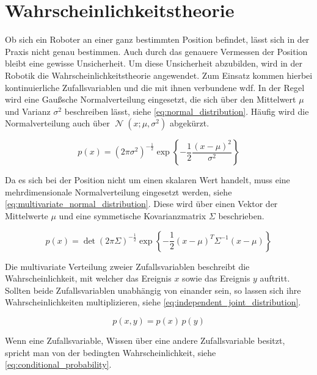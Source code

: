 \section{Wahrscheinlichkeitstheorie}
\label{sec:probability_theory}

Ob sich ein Roboter an einer ganz bestimmten Position befindet, lässt sich in der Praxis nicht genau bestimmen. Auch durch das genauere Vermessen der Position bleibt eine gewisse Unsicherheit. Um diese Unsicherheit abzubilden, wird in der Robotik die Wahrscheinlichkeitstheorie angewendet. Zum Einsatz kommen hierbei kontinuierliche Zufallsvariablen und die mit ihnen verbundene \Gls{wdf}. In der Regel wird eine Gaußsche Normalverteilung eingesetzt, die sich über den Mittelwert $\mu$ und Varianz $\sigma^2$ beschreiben lässt, siehe \autoref{eq:normal_distribution}. Häufig wird die Normalverteilung auch über $\operatorname{\mathcal{N}}{(x; \mu, \sigma^2)}$ abgekürzt.

\begin{equation}
p(x) = \left( 2 \pi \sigma^2 \right)^{-\frac12}  \exp{ \left\{ -\frac12 \frac{(x - \mu)^2}{\sigma^2} \right\} } \label{eq:normal_distribution}
\end{equation}

Da es sich bei der Position nicht um einen skalaren Wert handelt, muss eine mehrdimensionale Normalverteilung eingesetzt werden, siehe \autoref{eq:multivariate_normal_distribution}. Diese wird über einen Vektor der Mittelwerte $\mu$ und eine symmetische Kovarianzmatrix $\Sigma$ beschrieben.

\begin{equation}
p(x) = \operatorname{det}{\left( 2 \pi \Sigma \right)}^{-\frac12}  \exp{ \left\{ -\frac12 (x - \mu)^T \Sigma^{-1} (x - \mu) \right\} } \label{eq:multivariate_normal_distribution}
\end{equation}

Die multivariate Verteilung zweier Zufallsvariablen beschreibt die Wahrscheinlichkeit, mit welcher das Ereignis $x$ sowie das Ereignis $y$ auftritt. Sollten beide Zufallsvariablen unabhängig von einander sein, so lassen sich ihre Wahrscheinlichkeiten multiplizieren, siehe \autoref{eq:independent_joint_distribution}.

\begin{equation}
p(x, y) = p(x) \, p(y) \label{eq:independent_joint_distribution}
\end{equation}

Wenn eine Zufallsvariable, Wissen über eine andere Zufallsvariable besitzt, spricht man von der bedingten Wahrscheinlichkeit, siehe \autoref{eq:conditional_probability}.

